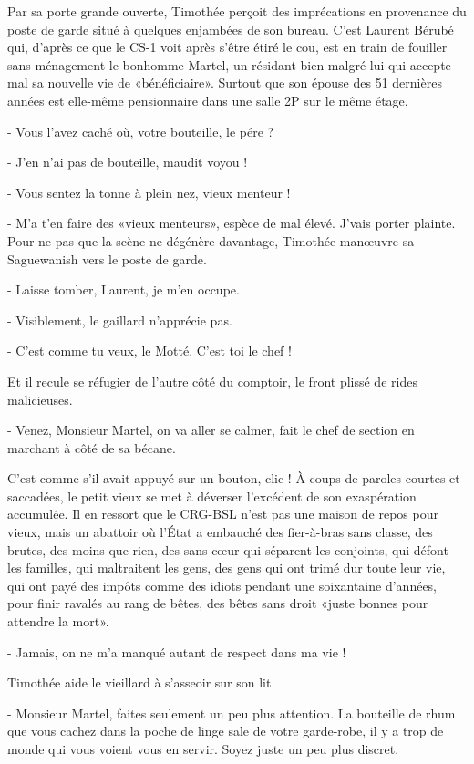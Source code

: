 Par sa porte grande ouverte, Timothée perçoit des imprécations en provenance du poste de garde situé à quelques enjambées de son bureau. C’est Laurent Bérubé qui, d’après ce que le CS-1 voit après s’être étiré le cou, est en train de fouiller sans ménagement le bonhomme Martel, un résidant bien malgré lui qui accepte mal sa nouvelle vie de «bénéficiaire». Surtout que son épouse des 51 dernières années est elle-même pensionnaire dans une salle 2P sur le même étage.

- Vous l’avez caché où, votre bouteille, le pére ?

- J’en n’ai pas de bouteille, maudit voyou !

- Vous sentez la tonne à plein nez, vieux menteur !

- M’a t’en faire des «vieux menteurs», espèce de mal élevé. J’vais porter plainte.
Pour ne pas que la scène ne dégénère davantage, Timothée manœuvre sa Saguewanish vers le poste de garde.

- Laisse tomber, Laurent, je m’en occupe.

- Visiblement, le gaillard n’apprécie pas.

- C’est comme tu veux, le Motté. C’est toi le chef !

Et il recule se réfugier de l’autre côté du comptoir, le front plissé de rides malicieuses.

- Venez, Monsieur Martel, on va aller se calmer, fait le chef de section en marchant à côté de sa bécane.

C’est comme s’il avait appuyé sur un bouton, clic ! À coups de paroles courtes et saccadées, le petit vieux se met à déverser l’excédent de son exaspération accumulée. Il en ressort que le CRG-BSL n’est pas une maison de repos pour vieux, mais un abattoir où l’État a embauché des fier-à-bras sans classe, des brutes, des moins que rien, des sans cœur qui séparent les conjoints, qui défont les familles, qui maltraitent les gens, des gens qui ont trimé dur toute leur vie, qui ont payé des impôts comme des idiots pendant une soixantaine d’années, pour finir ravalés au rang de bêtes, des bêtes sans droit «juste bonnes pour attendre la mort».

- Jamais, on ne m’a manqué autant de respect dans ma vie !

Timothée aide le vieillard à s’asseoir sur son lit.

- Monsieur Martel, faites seulement un peu plus attention. La bouteille de rhum que vous cachez dans la poche de linge sale de votre garde-robe, il y a trop de monde qui vous voient vous en servir. Soyez juste un peu plus discret.

